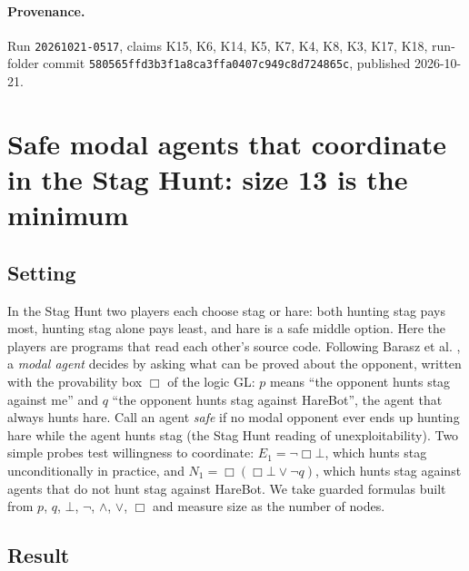 \documentclass{article}
\begin{document}
\paragraph{Provenance.}
Run \texttt{20261021-0517}, claims K15, K6, K14, K5, K7, K4, K8, K3, K17, K18, run-folder commit \texttt{580565ffd3b3f1a8ca3ffa0407c949c8d724865c}, published 2026-10-21.

\section{Safe modal agents that coordinate in the Stag Hunt: size 13 is the minimum}
\label{sec:staghunt-safe-coordinators}

\subsection*{Setting}

In the Stag Hunt two players each choose stag or hare: both hunting stag pays most, hunting stag
alone pays least, and hare is a safe middle option. Here the players are programs that read each
other's source code. Following Barasz et al. \cite{barasz2014robust}, a \emph{modal agent} decides by
asking what can be proved about the opponent, written with the provability box $\Box$ of the
logic GL: $p$ means ``the opponent hunts stag against me'' and $q$ ``the opponent hunts stag against
HareBot'', the agent that always hunts hare. Call an agent \emph{safe} if no modal opponent ever ends up
hunting hare while the agent hunts stag (the Stag Hunt reading of unexploitability). Two simple
probes test willingness to coordinate: $E_1 = \neg\Box\bot$, which hunts stag unconditionally in
practice, and $N_1 = \Box(\Box\bot \vee \neg q)$, which hunts stag against agents that do not
hunt stag against HareBot. We take guarded formulas built from $p$, $q$, $\bot$, $\neg$,
$\wedge$, $\vee$, $\Box$ and measure size as the number of nodes.

\subsection*{Result}
\end{document}
